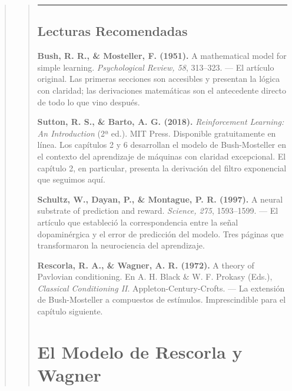 \documentclass[
  letterpaper,
  DIV=11,
  numbers=noendperiod]{scrreprt}
\begin{document}
\begin{tcolorbox}[enhanced jigsaw, arc=.35mm, bottomrule=.15mm, breakable, colback=white, colframe=quarto-callout-note-color-frame, left=2mm, leftrule=.75mm, opacityback=0, rightrule=.15mm, toprule=.15mm]
\begin{quote}
\begin{quote}
\begin{center}\rule{0.5\linewidth}{0.5pt}\end{center}

\mbox{}%
\section{Lecturas Recomendadas}\label{lecturas-recomendadas-2}

\textbf{Bush, R. R., \& Mosteller, F. (1951).} A mathematical model for
simple learning. \emph{Psychological Review, 58}, 313--323. --- El
artículo original. Las primeras secciones son accesibles y presentan la
lógica con claridad; las derivaciones matemáticas son el antecedente
directo de todo lo que vino después.

\textbf{Sutton, R. S., \& Barto, A. G. (2018).} \emph{Reinforcement
Learning: An Introduction} (2ª ed.). MIT Press. Disponible gratuitamente
en línea. Los capítulos 2 y 6 desarrollan el modelo de Bush-Mosteller en
el contexto del aprendizaje de máquinas con claridad excepcional. El
capítulo 2, en particular, presenta la derivación del filtro exponencial
que seguimos aquí.

\textbf{Schultz, W., Dayan, P., \& Montague, P. R. (1997).} A neural
substrate of prediction and reward. \emph{Science, 275}, 1593--1599. ---
El artículo que estableció la correspondencia entre la señal
dopaminérgica y el error de predicción del modelo. Tres páginas que
transformaron la neurociencia del aprendizaje.

\textbf{Rescorla, R. A., \& Wagner, A. R. (1972).} A theory of Pavlovian
conditioning. En A. H. Black \& W. F. Prokasy (Eds.), \emph{Classical
Conditioning II}. Appleton-Century-Crofts. --- La extensión de
Bush-Mosteller a compuestos de estímulos. Imprescindible para el
capítulo siguiente.


\mbox{}%
\chapter{El Modelo de Rescorla y
Wagner}\label{el-modelo-de-rescorla-y-wagner}


\end{quote}
\end{quote}
\end{tcolorbox}
\end{document}
